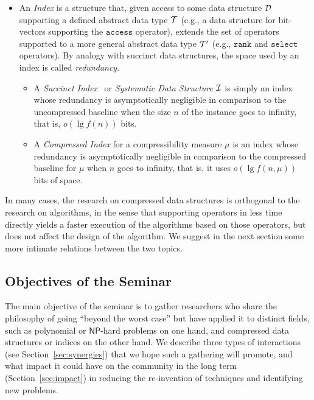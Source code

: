 \documentclass[a4paper,10pt]{article}
\newcommand{\access}{\ensuremath{\texttt{access}}}
\newcommand{\rank}{\ensuremath{\texttt{rank}}}
\newcommand{\select}{\ensuremath{\texttt{select}}}
\newcommand{\abstractDataType}{\ensuremath{{\cal T}}}
\newcommand{\NP}{\ensuremath{\mathsf{NP}}\xspace}
\begin{document}
\begin{itemize}
\item An \emph{Index} is a structure that, given access to some data structure $\cal D$ supporting a defined abstract data type $\abstractDataType$ (e.g., a data structure for bit-vectors supporting the {\access} operator), extends the set of operators supported to a more general abstract data type $\abstractDataType'$ (e.g., {\rank} and {\select} operators).  By analogy with succinct data structures, the space used by an index is called \emph{redundancy}.
  \begin{itemize}
\item A \emph{Succinct Index}~\cite{2011-TALG-SuccinctIndexesForStringsBinaryRelationsAndMultiLabeledTrees-BarbayHeMunroRao} or \emph{Systematic Data Structure} $\cal I$ is simply an index whose redundancy is asymptotically negligible in comparison to the uncompressed baseline when the size $n$ of the instance goes to infinity, that is, $o(\lg f(n))$ bits.

\item A \emph{Compressed Index} for a compressibility measure $\mu$ is an index whose redundancy is asymptotically negligible in comparison to the compressed baseline for $\mu$ when $n$ goes to infinity, that is, it uses $o(\lg f(n,\mu))$ bits of space.
  \end{itemize}

\end{itemize}

In many cases, the research on compressed data structures is orthogonal to the research on algorithms, in the sense that supporting operators in less time directly yields a faster execution of the algorithms based on those operators, but does not affect the design of the algorithm. We suggest in the next section some more intimate relations between the two topics.


\subsection{Objectives of the Seminar}
\label{sec:objectives-seminar}

The main objective of the seminar is to gather researchers who share the philosophy of going ``beyond the worst case'' but have applied it to distinct fields, such as polynomial or \NP-hard problems on one hand, and compressed data structures or indices on the other hand.  We describe three types of interactions (see Section~\ref{sec:synergies}) that we hope such a gathering will promote, and what impact it could have on the community in the long term  (Section~\ref{sec:impact}) in reducing the re-invention of techniques and identifying new problems.
\end{document}
